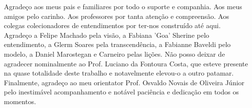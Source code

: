     Agradeço aos meus pais e familiares por todo o suporte e companhia. Aos
meus amigos pelo carinho. Aos professores por tanta atenção e compreensão.
Aos colegas colecionadores de entendimentos por ter-nos construído até aqui.
Agradeço a Felipe Machado pela visão, a Fabiana 'Goa' Sherine pelo entendimento,
a Glerm Soares pela transcendência, a Fabianne Baveldi pelo modelo, a Daniel
Marostegan e Carneiro pelas lições. Não posso deixar de agradecer nominalmente
ao Prof. Luciano da Fontoura Costa, que esteve presente na quase totalidade deste
trabalho e notavelmente elevou-o a outro patamar. Finalmente, agradeço ao meu 
orientator Prof. Osvaldo Novais de Oliveira Júnior pelo inestimável acompanhamento
e notável paciência e dedicação em todos os momentos.
